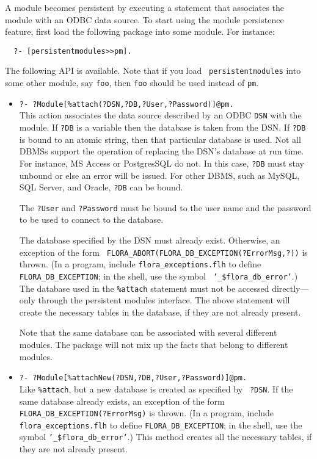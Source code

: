A module becomes persistent by executing a statement that associates the
module with an ODBC data source. To start using the module persistence
feature, first load the following package into some module. For instance:
\begin{verbatim}
  ?- [persistentmodules>>pm].
\end{verbatim}
The following API is available. Note that if you load {\tt
  persistentmodules} into some other module, say {\tt foo}, then {\tt foo}
should be used instead of {\tt pm}.    
\begin{itemize}
\item {\tt ?- ?Module[\%attach(?DSN,?DB,?User,?Password)]@pm.}\\
  This action associates the data source described by an ODBC {\tt DSN}
  with the module.  If {\tt ?DB} is a variable then the database is taken
  from the DSN. If {\tt ?DB} is bound to an atomic string, then that particular
  database is used. Not all DBMSs support the operation of replacing the
  DSN's database at run time. For instance, MS Access or PostgresSQL do not.
  In this case, {\tt ?DB} must stay unbound or else an error will be issued.
  For other DBMS, such as MySQL, SQL Server, and Oracle, {\tt ?DB} can be
  bound. 

  The {\tt ?User} and {\tt ?Password} must be bound to the user name and
  the password to be used to connect to the database.

  The database specified by the DSN must already exist. Otherwise, an
  exception of the form {\tt
    FLORA\_ABORT(FLORA\_DB\_EXCEPTION(?ErrorMsg,?))} is thrown.  (In a
  program, include {\tt flora\_exceptions.flh} to define {\tt
    FLORA\_DB\_EXCEPTION}; in the shell, use the symbol {\tt
    '\_\$flora\_db\_error'}.)  The database used in the {\tt \%attach}
  statement must not be accessed directly---only through the persistent
  modules interface.  The above statement will create the necessary tables
  in the database, if they are not already present.

  Note that the same database can be associated with several different
  modules. The package will not mix up the facts that belong to different
  modules.
\item {\tt ?- ?Module[\%attachNew(?DSN,?DB,?User,?Password)]@pm.}\\
  Like {\tt \%attach}, but a new database is created as specified by {\tt
    ?DSN}.  If the same database already exists, an exception of the form
  {\tt FLORA\_DB\_EXCEPTION(?ErrorMsg)} is thrown.  (In a program, include
  {\tt flora\_exceptions.flh} to define {\tt FLORA\_DB\_EXCEPTION}; in the
  shell, use the symbol {\tt '\_\$flora\_db\_error'}.)  This method creates
  all the necessary tables, if they are not already present.
  

\end{itemize}
